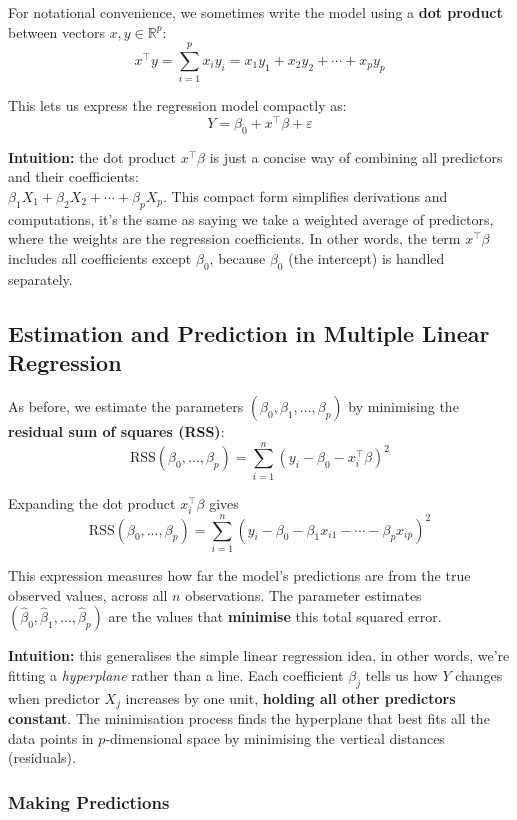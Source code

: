 \documentclass[
  letterpaper,
  DIV=11,
  numbers=noendperiod]{scrartcl}
\begin{document}
For notational convenience, we sometimes write the model using a
\textbf{dot product} between vectors \(x, y \in \mathbb{R}^p\):
\[x^\top y = \sum_{i=1}^{p} x_i y_i = x_1 y_1 + x_2 y_2 + \cdots + x_p y_p\]

This lets us express the regression model compactly as:
\[Y = \beta_0 + x^\top \beta + \varepsilon\]

\textbf{Intuition:} the dot product \(x^\top \beta\) is just a concise
way of combining all predictors and their coefficients:\\
\(\beta_1 X_1 + \beta_2 X_2 + \cdots + \beta_p X_p\). This compact form
simplifies derivations and computations, it's the same as saying we take
a weighted average of predictors, where the weights are the regression
coefficients. In other words, the term \(x^\top \beta\) includes all
coefficients except \(\beta_0\), because \(\beta_0\) (the intercept) is
handled separately.

\subsection{Estimation and Prediction in Multiple Linear
Regression}\label{estimation-and-prediction-in-multiple-linear-regression}

As before, we estimate the parameters
\((\beta_0, \beta_1, \ldots, \beta_p)\) by minimising the
\textbf{residual sum of squares (RSS)}:
\[\text{RSS}(\beta_0, \ldots, \beta_p) = \sum_{i=1}^{n} (y_i - \beta_0 - x_i^\top \beta)^2\]

Expanding the dot product \(x_i^\top \beta\) gives
\[\text{RSS}(\beta_0, \ldots, \beta_p) = \sum_{i=1}^{n} (y_i - \beta_0 - \beta_1 x_{i1} - \cdots - \beta_p x_{ip})^2\]

This expression measures how far the model's predictions are from the
true observed values, across all \(n\) observations. The parameter
estimates \((\hat{\beta}_0, \hat{\beta}_1, \ldots, \hat{\beta}_p)\) are
the values that \textbf{minimise} this total squared error.

\textbf{Intuition:} this generalises the simple linear regression idea,
in other words, we're fitting a \emph{hyperplane} rather than a line.
Each coefficient \(\beta_j\) tells us how \(Y\) changes when predictor
\(X_j\) increases by one unit, \textbf{holding all other predictors
constant}. The minimisation process finds the hyperplane that best fits
all the data points in \(p\)-dimensional space by minimising the
vertical distances (residuals).

\subsubsection{Making Predictions}\label{making-predictions}
\end{document}
